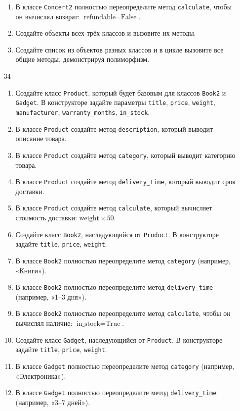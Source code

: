 \begin{enumerate}
\begin{enumerate}[leftmargin=*]
    \item В классе \texttt{Concert2} полностью переопределите метод \texttt{calculate}, чтобы он вычислял возврат: \( \text{refundable} = \text{False} \).
    \item Создайте объекты всех трёх классов и вызовите их методы.
    \item Создайте список из объектов разных классов и в цикле вызовите все общие методы, демонстрируя полиморфизм.
\end{enumerate}
\item[34]
\begin{enumerate}[leftmargin=*]
    \item Создайте класс \texttt{Product}, который будет базовым для классов \texttt{Book2} и \texttt{Gadget}. В конструкторе задайте параметры \texttt{title}, \texttt{price}, \texttt{weight}, \texttt{manufacturer}, \texttt{warranty\_months}, \texttt{in\_stock}.
    \item В классе \texttt{Product} создайте метод \texttt{description}, который выводит описание товара.
    \item В классе \texttt{Product} создайте метод \texttt{category}, который выводит категорию товара.
    \item В классе \texttt{Product} создайте метод \texttt{delivery\_time}, который выводит срок доставки.
    \item В классе \texttt{Product} создайте метод \texttt{calculate}, который вычисляет стоимость доставки: \( \text{weight} \times 50 \).
    \item Создайте класс \texttt{Book2}, наследующийся от \texttt{Product}. В конструкторе задайте \texttt{title}, \texttt{price}, \texttt{weight}.
    \item В классе \texttt{Book2} полностью переопределите метод \texttt{category} (например, «Книги»).
    \item В классе \texttt{Book2} полностью переопределите метод \texttt{delivery\_time} (например, «1–3 дня»).
    \item В классе \texttt{Book2} полностью переопределите метод \texttt{calculate}, чтобы он вычислял наличие: \( \text{in\_stock} = \text{True} \).
    \item Создайте класс \texttt{Gadget}, наследующийся от \texttt{Product}. В конструкторе задайте \texttt{title}, \texttt{price}, \texttt{weight}.
    \item В классе \texttt{Gadget} полностью переопределите метод \texttt{category} (например, «Электроника»).
    \item В классе \texttt{Gadget} полностью переопределите метод \texttt{delivery\_time} (например, «3–7 дней»).

\end{enumerate}
\end{enumerate}
